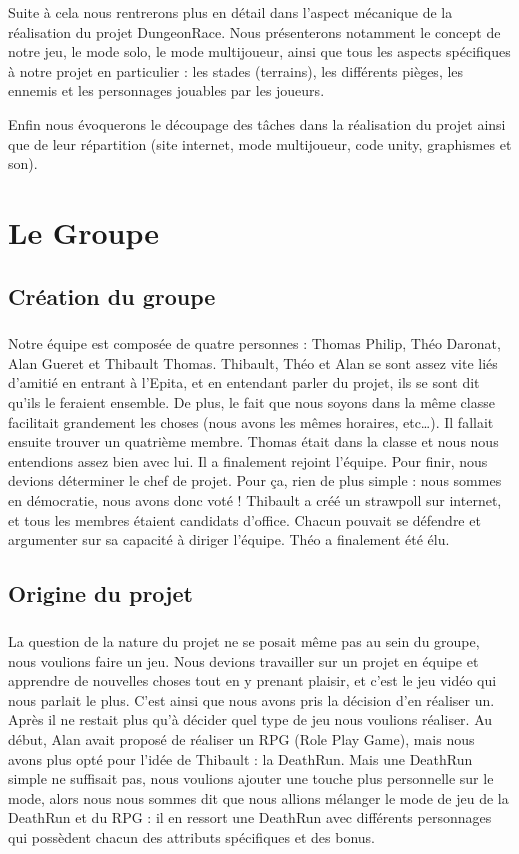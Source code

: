 \documentclass[12pt]{report}
\begin{document}
	Suite à cela nous rentrerons plus en détail dans l’aspect mécanique de la réalisation du projet DungeonRace. Nous présenterons notamment  le concept de notre jeu, le mode solo, le mode multijoueur, ainsi que tous les aspects spécifiques à notre projet en particulier : les stades (terrains), les différents pièges, les ennemis et les personnages jouables par les joueurs. 

	Enfin nous évoquerons le découpage des tâches dans la réalisation du projet ainsi que de leur répartition (site internet, mode multijoueur, code unity, graphismes et son). 
	
\chapter{Le Groupe}
	
	\section{Création du groupe}
	\paragraph{}
	Notre équipe est composée de quatre personnes : Thomas Philip, Théo Daronat, Alan Gueret et Thibault Thomas. 
Thibault, Théo et Alan se sont assez vite liés d'amitié en entrant à l'Epita, et en entendant parler du projet, ils se sont dit qu'ils le feraient ensemble. De plus, le fait que nous soyons dans la même classe facilitait grandement les choses (nous avons les mêmes horaires, etc…). Il fallait ensuite trouver un quatrième membre. Thomas était dans la classe et nous nous entendions assez bien avec lui. Il a finalement rejoint l'équipe. 
Pour finir, nous devions déterminer le chef de projet. Pour ça, rien de plus simple : nous sommes en démocratie, nous avons donc voté ! Thibault a créé un strawpoll sur internet, et tous les membres étaient candidats d'office. Chacun pouvait se défendre et argumenter sur sa capacité à diriger l'équipe. Théo a finalement été élu. 

	\section{Origine du projet}
	\paragraph{}
	La question de la nature du projet ne se posait même pas au sein du groupe, nous voulions faire un jeu. Nous devions travailler sur un projet en équipe et apprendre de nouvelles choses tout en y prenant plaisir, et c'est le jeu vidéo qui nous parlait le plus. C'est ainsi que nous avons pris la décision d'en réaliser un. Après il ne restait plus qu'à décider quel type de jeu nous voulions réaliser. Au début, Alan avait proposé de réaliser un RPG (Role Play Game), mais nous avons plus opté pour l'idée de Thibault : la DeathRun. Mais une DeathRun simple ne suffisait pas, nous voulions ajouter une touche plus personnelle sur le mode, alors nous nous sommes dit que nous allions mélanger le mode de jeu de la DeathRun et du RPG : il en ressort une DeathRun avec différents personnages qui possèdent chacun des attributs spécifiques et des bonus.
	
\end{document}
